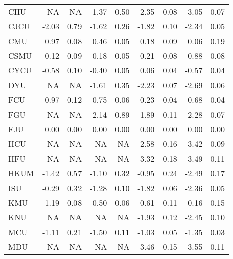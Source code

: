 \begin{longtable}[t]{lrrrrrrrr}
\hspace{1em}CHU & NA & NA & -1.37 & 0.50 & -2.35 & 0.08 & -3.05 & 0.07\\
\hspace{1em}CJCU & -2.03 & 0.79 & -1.62 & 0.26 & -1.82 & 0.10 & -2.34 & 0.05\\
\hspace{1em}CMU & 0.97 & 0.08 & 0.46 & 0.05 & 0.18 & 0.09 & 0.06 & 0.19\\
\hspace{1em}CSMU & 0.12 & 0.09 & -0.18 & 0.05 & -0.21 & 0.08 & -0.88 & 0.08\\
\hspace{1em}CYCU & -0.58 & 0.10 & -0.40 & 0.05 & 0.06 & 0.04 & -0.57 & 0.04\\
\hspace{1em}DYU & NA & NA & -1.61 & 0.35 & -2.23 & 0.07 & -2.69 & 0.06\\
\hspace{1em}FCU & -0.97 & 0.12 & -0.75 & 0.06 & -0.23 & 0.04 & -0.68 & 0.04\\
\hspace{1em}FGU & NA & NA & -2.14 & 0.89 & -1.89 & 0.11 & -2.28 & 0.07\\
\hspace{1em}FJU & 0.00 & 0.00 & 0.00 & 0.00 & 0.00 & 0.00 & 0.00 & 0.00\\
\hspace{1em}HCU & NA & NA & NA & NA & -2.58 & 0.16 & -3.42 & 0.09\\
\hspace{1em}HFU & NA & NA & NA & NA & -3.32 & 0.18 & -3.49 & 0.11\\
\hspace{1em}HKUM & -1.42 & 0.57 & -1.10 & 0.32 & -0.95 & 0.24 & -2.49 & 0.17\\
\hspace{1em}ISU & -0.29 & 0.32 & -1.28 & 0.10 & -1.82 & 0.06 & -2.36 & 0.05\\
\hspace{1em}KMU & 1.19 & 0.08 & 0.50 & 0.06 & 0.61 & 0.11 & 0.16 & 0.15\\
\hspace{1em}KNU & NA & NA & NA & NA & -1.93 & 0.12 & -2.45 & 0.10\\
\hspace{1em}MCU & -1.11 & 0.21 & -1.50 & 0.11 & -1.03 & 0.05 & -1.35 & 0.03\\
\hspace{1em}MDU & NA & NA & NA & NA & -3.46 & 0.15 & -3.55 & 0.11\\

\end{longtable}
